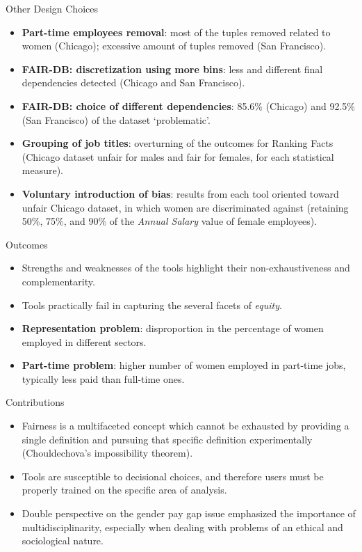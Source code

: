 \documentclass[usenames,dvipsnames]{beamer}
\begin{document}
    
    \begin{frame}{Other Design Choices}
        \begin{itemize}
            \item \textbf{Part-time employees removal}: most of the tuples removed related to women (Chicago); excessive amount of tuples removed (San Francisco).
            \item \textbf{FAIR-DB: discretization using more bins}: less and different final dependencies detected (Chicago and San Francisco).
            \item \textbf{FAIR-DB: choice of different dependencies}: 85.6\% (Chicago) and 92.5\% (San Francisco) of the dataset `problematic'.
            \item \textbf{Grouping of job titles}: overturning of the outcomes for Ranking Facts (Chicago dataset unfair for males and fair for females, for each statistical measure).
            \item \textbf{Voluntary introduction of bias}: results from each tool oriented toward unfair Chicago dataset, in which women are discriminated against (retaining 50\%, 75\%, and 90\% of the \textit{Annual Salary} value of female employees).
        \end{itemize}
    \end{frame}
    
    
    \begin{frame}{Outcomes}
        \begin{itemize}
            \item Strengths and weaknesses of the tools highlight their non-exhaustiveness and complementarity.
            \item Tools practically fail in capturing the several facets of \textit{equity}.
            \item \textbf{Representation problem}: disproportion in the percentage of women employed in different sectors.
            \item \textbf{Part-time problem}: higher number of women employed in part-time jobs, typically less paid than full-time ones.
        \end{itemize}
    \end{frame}
    
    
    \begin{frame}{Contributions}
        \begin{itemize}
            \item Fairness is a multifaceted concept which cannot be exhausted by providing a single definition and pursuing that specific definition experimentally (Chouldechova's impossibility theorem).
            \item Tools are susceptible to decisional choices, and therefore users must be properly trained on the specific area of analysis.
            \item Double perspective on the gender pay gap issue emphasized the importance of multidisciplinarity, especially when dealing with problems of an ethical and sociological nature.
        \end{itemize}
    \end{frame}
    
\end{document}
